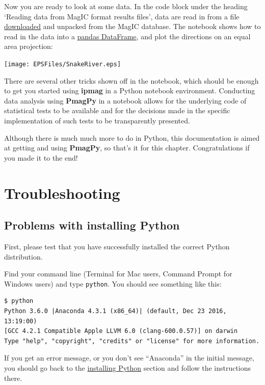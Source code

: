 \documentclass[11pt]{book}
\begin{document}
{{
 Now you are ready to look at some data.  In the code block under the heading `Reading data from MagIC format results files',  data are read in from a file \href{#magic_download}{downloaded} and unpacked from the MagIC database.   The notebook shows how to read in the data into a \href{#pandas}{pandas DataFrame}, and plot the directions on an equal area projection:

\texttt{[image: EPSFiles/SnakeRiver.eps]}

There are several other tricks shown off in the notebook, which should be enough to get you started using {\bf ipmag} in a Python notebook environment.  Conducting data analysis  using {\bf PmagPy} in a notebook allows for the underlying code of statistical tests to be available and for the decisions made in the specific implementation of such tests to be transparently presented.

Although there is much much more to do in Python, this documentation is aimed at getting and using {\bf PmagPy}, so that's it for this chapter. Congratulations if you made it to the end!


\chapter{Troubleshooting}
\label{chap:trouble}

\section{Problems with installing Python}

First, please test that you have successfully installed the correct Python distribution.

Find your command line (Terminal for Mac users, Command Prompt for Windows users) and type \texttt{python}.  You should see something like this:


\begin{verbatim}$ python
Python 3.6.0 |Anaconda 4.3.1 (x86_64)| (default, Dec 23 2016, 13:19:00)
[GCC 4.2.1 Compatible Apple LLVM 6.0 (clang-600.0.57)] on darwin
Type "help", "copyright", "credits" or "license" for more information.
\end{verbatim}

If you get an error message, or you don't see ``Anaconda'' in the initial message, you should go back to the \href{#getting_python}{installing Python} section and follow the instructions there.



}}
\end{document}
